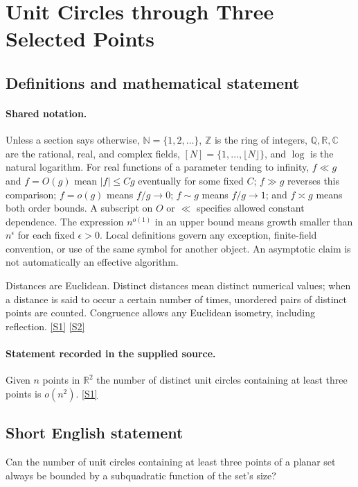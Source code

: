 \documentclass[11pt,a4paper]{article}
\newcommand{\N}{\mathbb{N}}
\newcommand{\Z}{\mathbb{Z}}
\newcommand{\Q}{\mathbb{Q}}
\newcommand{\R}{\mathbb{R}}
\newcommand{\C}{\mathbb{C}}
\newcommand{\sref}[2]{\hyperlink{source:#1:#2}{[S#2]}}
\begin{document}
\section{Unit Circles through Three Selected Points}\label{statement}


\subsection{Definitions and mathematical statement}

\paragraph{Shared notation.}Unless a section says otherwise, $\N=\{1,2,\ldots\}$,
$\Z$ is the ring of integers, $\Q,\R,\C$ are the rational, real, and complex
fields, $[N]=\{1,\ldots,\lfloor N\rfloor\}$, and $\log$ is the natural
logarithm. For real functions of a parameter tending to infinity,
$f\ll g$ and $f=O(g)$ mean $|f|\leq Cg$ eventually for some fixed $C$;
$f\gg g$ reverses this comparison; $f=o(g)$ means $f/g\to0$;
$f\sim g$ means $f/g\to1$; and $f\asymp g$ means both order bounds.
A subscript on $O$ or $\ll$ specifies allowed constant dependence.
The expression $n^{o(1)}$ in an upper bound means growth smaller than
$n^\epsilon$ for each fixed $\epsilon>0$. Local definitions govern any
exception, finite-field convention, or use of the same symbol for another
object. An asymptotic claim is not automatically an effective algorithm.



Distances are Euclidean. Distinct distances mean distinct numerical values; when a distance is said to occur a certain number of times, unordered pairs of distinct points are counted. Congruence allows any Euclidean isometry, including reflection. \sref{statement}{1} \sref{statement}{2}

\paragraph{Statement recorded in the supplied source.}
Given $n$ points in $\mathbb{R}^2$ the number of distinct unit circles containing at least three points is $o(n^2)$. \sref{statement}{1}

\subsection{Short English statement}

Can the number of unit circles containing at least three points of a planar set always be bounded by a subquadratic function of the set's size?
\end{document}
